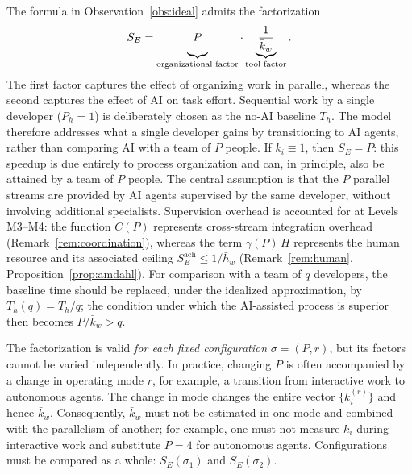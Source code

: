 \begin{remark}\label{rem:factorization}
The formula in Observation~\ref{obs:ideal} admits the factorization
\[
  S_E = \underbrace{P\vphantom{\frac{1}{\bar{k}_w}}}_{\text{organizational factor}} \cdot \underbrace{\frac{1}{\bar{k}_w}}_{\text{tool factor}}.
\]
The first factor captures the effect of organizing work in parallel, whereas the second captures the effect of AI on task effort. Sequential work by a single developer ($P_h = 1$) is deliberately chosen as the no-AI baseline $T_h$. The model therefore addresses what a single developer gains by transitioning to AI agents, rather than comparing AI with a team of $P$ people. If $k_i \equiv 1$, then $S_E = P$: this speedup is due entirely to process organization and can, in principle, also be attained by a team of $P$ people. The central assumption is that the $P$ parallel streams are provided by AI agents supervised by the same developer, without involving additional specialists. Supervision overhead is accounted for at Levels M3--M4: the function $C(P)$ represents cross-stream integration overhead (Remark~\ref{rem:coordination}), whereas the term $\gamma(P)\,H$ represents the human resource and its associated ceiling $S_E^{\mathrm{ach}} \le 1/\bar{h}_w$ (Remark~\ref{rem:human}, Proposition~\ref{prop:amdahl}). For comparison with a team of $q$ developers, the baseline time should be replaced, under the idealized approximation, by $T_h(q) = T_h/q$; the condition under which the AI-assisted process is superior then becomes $P/\bar{k}_w > q$.

\medskip
The factorization is valid \emph{for each fixed configuration} $\sigma = (P, r)$, but its factors cannot be varied independently. In practice, changing $P$ is often accompanied by a change in operating mode $r$, for example, a transition from interactive work to autonomous agents. The change in mode changes the entire vector $\{k_i^{(r)}\}$ and hence $\bar{k}_w$. Consequently, $\bar{k}_w$ must not be estimated in one mode and combined with the parallelism of another; for example, one must not measure $k_i$ during interactive work and substitute $P = 4$ for autonomous agents. Configurations must be compared as a whole: $S_E(\sigma_1)$ and $S_E(\sigma_2)$.
\end{remark}

